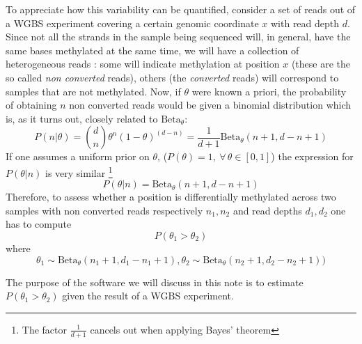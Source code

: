 \documentclass[11pt]{amsart}
\newcommand{\betapdf}{\mbox{Beta}_\theta}
\begin{document}
To appreciate how this variability can be quantified, consider a set of reads out of a WGBS experiment covering a certain genomic coordinate $x$ with read depth $d$. Since not all the strands in the sample being sequenced will, in general,  have the same bases methylated at the same time, we will have a collection of heterogeneous reads : some will indicate methylation at position $x$ (these are the so called {\em non converted} reads), others (the {\em converted} reads) will correspond to samples that are not methylated. 
Now, if $\theta$ were known a priori, the probability of obtaining $n$ non converted reads would be given a binomial distribution which is, as it turns out, closely related to $\betapdf$:
\[P(n|\theta)={d \choose n}\theta^n ({1-\theta})^{(d-n)}=\frac{1}{d+1}\betapdf(n+1,d-n+1)\]
If one assumes a uniform prior on $\theta$, ($P(\theta)=1, \ \forall\, \theta \in [0,1]$) the expression for $P(\theta|n)$ is very similar \footnote{The factor $\frac{1}{d+1}$ cancels out when applying Bayes' theorem}
\[P(\theta|n)=\betapdf(n+1,d-n+1)\]
Therefore, to assess whether a position is differentially methylated across two samples with non converted reads respectively $n_1,n_2$ and read depths $d_1,d_2$ one
has to compute 
\[P(\theta_1>\theta_2) \] where 
\begin{equation}
\label{ineq}
\theta_1 \sim \betapdf(n_1+1,d_1-n_1+1) , \theta_2 \sim \betapdf(n_2+1,d_2-n_2+1))
\end{equation}

The purpose of the software we will discuss in this note is to estimate $P(\theta_1>\theta_2)$ given the result of a WGBS experiment.

 
\end{document}
